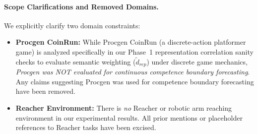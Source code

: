 \paragraph{Scope Clarifications and Removed Domains.}
We explicitly clarify two domain constraints:
\begin{itemize}
    \item \textbf{Procgen CoinRun:} While Procgen CoinRun (a discrete-action platformer game) is analyzed specifically in our Phase~1 representation correlation sanity checks to evaluate semantic weighting ($\tilde{d}_{rep}$) under discrete game mechanics, \emph{Procgen was NOT evaluated for continuous competence boundary forecasting}. Any claims suggesting Procgen was used for competence boundary forecasting have been removed.
    \item \textbf{Reacher Environment:} There is \emph{no} Reacher or robotic arm reaching environment in our experimental results. All prior mentions or placeholder references to Reacher tasks have been excised.
\end{itemize}
